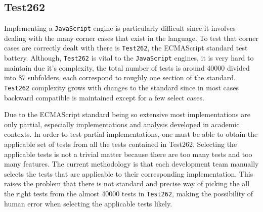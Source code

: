 \documentclass[runningheads]{llncs}
\begin{document}
\subsection{Test262}
\label{subsec:Test262}


Implementing a \texttt{JavaScript} engine is particularly difficult since it involves dealing with the many corner cases that exist in the language. To test that corner cases are correctly dealt with there is \texttt{Test262}, the ECMAScript standard test battery. Although, \texttt{Test262} is vital to the \texttt{JavaScript} engines, it is very hard to maintain due it's complexity, the total number of tests is around 40000 divided into 87 subfolders, each correspond to roughly one section of the standard. \texttt{Test262} complexity grows with changes to the standard since in most cases backward compatible is maintained except for a few select cases. 



Due to the ECMAScript standard being so extensive most implementations are only partial, especially implementations and analysis developed in academic contexts. In order to test partial implementations, one must be able to obtain the applicable set of tests from all the tests contained in Test262. Selecting the applicable tests is not a trivial matter because there are too many tests and too many features. The current methodology is that each development team manually selects the tests that are applicable to their corresponding implementation. This raises the problem that there is not standard and precise way of picking the all the right tests from the almost 40000 tests in \texttt{Test262}, making the possibility of human error when selecting the applicable tests likely.
\end{document}
